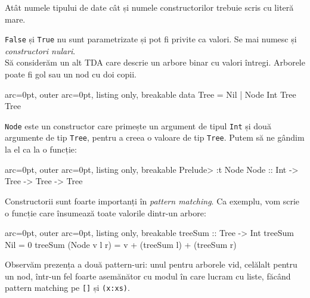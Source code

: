 \begin{tcolorbox}[colback=yellow!40, colframe=yellow!60, breakable]
Atât numele tipului de date cât și numele constructorilor trebuie scris cu literă mare.
\end{tcolorbox}

\texttt{False} și \texttt{True} nu sunt parametrizate și pot fi privite ca valori. Se mai numesc și \textit{constructori nulari}.\\
Să considerăm un alt TDA care descrie un arbore binar cu valori întregi. Arborele poate fi gol sau un nod cu doi copii.


\begin{tcblisting}{ arc=0pt, outer arc=0pt, listing only, breakable}
data Tree = Nil | Node Int Tree Tree

\end{tcblisting}


\texttt{Node} este un constructor care primește un argument de tipul \texttt{Int} și două argumente de tip \texttt{Tree}, pentru a creea o valoare de tip \texttt{Tree}. Putem să ne gândim la el ca la o funcție:


\begin{tcblisting}{ arc=0pt, outer arc=0pt, listing only, breakable}
Prelude> :t Node
Node :: Int -> Tree -> Tree -> Tree

\end{tcblisting}


Constructorii sunt foarte importanți în \textit{pattern matching}. Ca exemplu, vom scrie o funcție care însumează toate valorile dintr-un arbore:


\begin{tcblisting}{ arc=0pt, outer arc=0pt, listing only, breakable}
treeSum :: Tree -> Int
treeSum Nil = 0
treeSum (Node v l r) = v + (treeSum l) + (treeSum r)

\end{tcblisting}


Observăm prezența a două pattern-uri: unul pentru arborele vid, celălalt pentru un nod, într-un fel foarte asemănător cu modul în care lucram cu liste, făcând pattern matching pe \texttt{[]} și \texttt{(x:xs)}.

